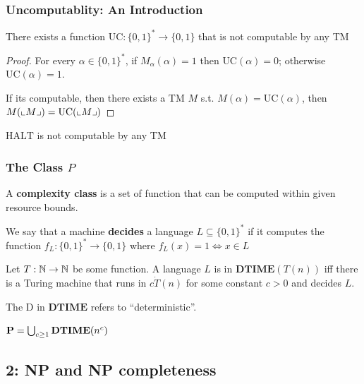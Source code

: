\documentclass[11pt]{article}
\def \HALT {\text{HALT}}
\def \DTIME {\textbf{DTIME}}
\begin{document}
\subsubsection{Uncomputablity: An Introduction}
\label{sec:orgfb68dbb}
\begin{theorem}[]
There exists a function \(\text{UC}:\{0,1\}^*\to\{0,1\}\) that is not computable by any TM
\end{theorem}

\begin{proof}
For every \(\alpha\in\{0,1\}^*\), if \(M_{\alpha}(\alpha)=1\) then \(\text{UC}(\alpha)=0\);
otherwise \(\text{UC}(\alpha)=1\).

If its computable, then there exists a TM \(M\) s.t. \(M(\alpha)=\text{UC}(\alpha)\), then
\(M(\llcorner M \lrcorner)=\text{UC}(\llcorner M \lrcorner)\)
\end{proof}

\begin{theorem}[]
\(\HALT\) is not computable by any TM
\end{theorem}

\subsubsection{The Class \texorpdfstring{\(P\)}{P}}
\label{sec:orgd2b86b7}
A \textbf{complexity class} is a set of function that can be computed within given resource bounds.

We say that a machine \textbf{decides} a language \(L\subseteq\{0,1\}^*\) if it computes the
function \(f_L:\{0,1\}^*\to\{0,1\}\) where \(f_L(x)=1\Leftrightarrow x\in L\)

\begin{definition}[]
Let \(T:\mathbb{N}\to\mathbb{N}\) be some function. A language \(L\) is in \(\DTIME(T(n))\) iff there is a
Turing machine that runs in \(c\dot T(n)\) for some constant \(c>0\) and decides \(L\).
\end{definition}

The D in \(\DTIME\) refers to ``deterministic''.

\begin{definition}[]
\(\bP=\bigcup_{c\ge1}\DTIME(n^c)\)
\end{definition}

\subsection{2: NP and NP completeness}
\label{sec:org7718105}
\end{document}
